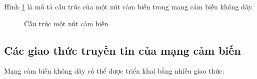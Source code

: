 \documentclass{hust}
\begin{document}
Hình \ref{fig:wsn-nodes} là mô tả cấu trúc của một nút cảm biến trong mạng cảm biến không dây.


\begin{figure}[htb]
	\caption{Cấu trúc một nút cảm biến}\label{fig:wsn-nodes}
\end{figure}

\subsection{Các giao thức truyền tin của mạng cảm biến}
Mạng cảm biến không dây có thể được triển khai bằng nhiều giao thức: \cite{akkaya2005survey}
\end{document}
